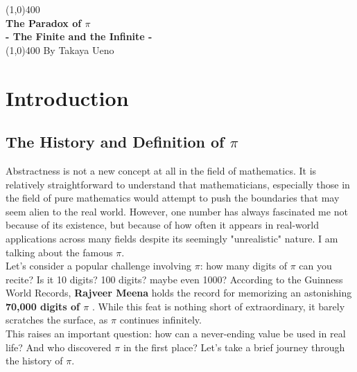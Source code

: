 \documentclass[12pt]{article}
\begin{document}
\begin{titlepage}
\begin{center}
\vspace*{1cm}
\vfill
\line(1,0){400}\\[1mm]
\huge{\textbf{The Paradox of $\pi$}}\\[3mm]
\Large{\textbf{- The Finite and the Infinite -}}\\[1mm]
\line(1,0){400}
\vfill
By Takaya Ueno
\end{center}
\end{titlepage}

\section{Introduction}

\subsection{The History and Definition of $\pi$}
Abstractness is not a new concept at all in the field of mathematics. It is relatively straightforward to understand that mathematicians, especially those in the field of pure mathematics would attempt to push the boundaries that may seem alien to the real world. However, one number has always fascinated me \textendash not because of its existence, but because of how often it appears in real-world applications across many fields despite its seemingly "unrealistic" nature. I am talking about the famous $\pi$.\\

\noindent Let's consider a popular challenge involving $\pi$: how many digits of $\pi$ can you recite? Is it 10 digits? 100 digits? maybe even 1000? According to the Guinness World Records, \textbf{Rajveer Meena} holds the record for memorizing an astonishing \textbf{70,000 digits of $\pi$} \cite{guinness2017}. While this feat is nothing short of extraordinary, it barely scratches the surface, as $\pi$ continues infinitely.\\

\noindent This raises an important question: how can a never-ending value be used in real life? And who discovered $\pi$ in the first place? Let's take a brief journey through the history of $\pi$. \\
\end{document}
